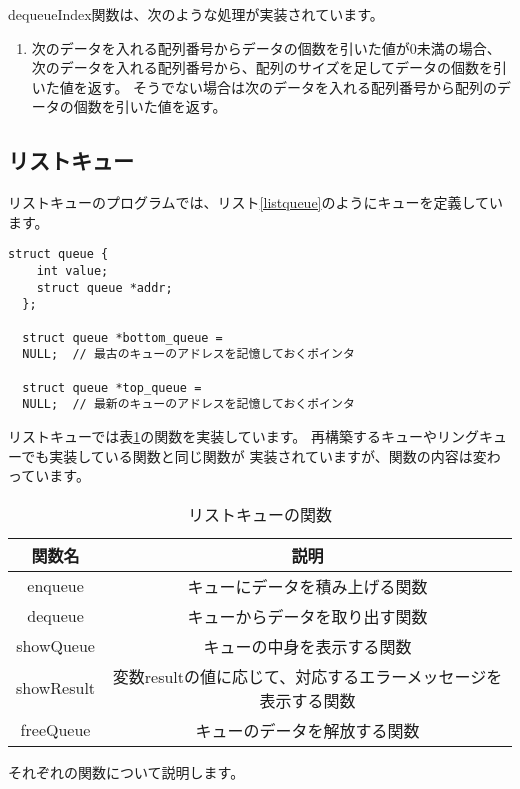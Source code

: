 \documentclass[a4j]{jarticle}
\begin{document}
dequeueIndex関数は、次のような処理が実装されています。
\begin{enumerate}
  \item 次のデータを入れる配列番号からデータの個数を引いた値が0未満の場合、
        次のデータを入れる配列番号から、配列のサイズを足してデータの個数を引いた値を返す。
        そうでない場合は次のデータを入れる配列番号から配列のデータの個数を引いた値を返す。
\end{enumerate}

\subsection{リストキュー}
リストキューのプログラムでは、リスト\ref{listqueue}のようにキューを定義しています。
\begin{lstlisting}[caption=リストキュープログラムのキューの定義,label=listqueue]
  struct queue {
    int value;
    struct queue *addr;
  };

  struct queue *bottom_queue =
  NULL;  // 最古のキューのアドレスを記憶しておくポインタ

  struct queue *top_queue =
  NULL;  // 最新のキューのアドレスを記憶しておくポインタ
\end{lstlisting}

リストキューでは表\ref{listqueuefunc}の関数を実装しています。
再構築するキューやリングキューでも実装している関数と同じ関数が
実装されていますが、関数の内容は変わっています。

\begin{table}[htbp]
  \centering
  \caption{リストキューの関数}
  \label{listqueuefunc}
  \begin{tabular}{|c|c|}
    \hline
    関数名        & 説明                                 \\
    \hline
    enqueue    & キューにデータを積み上げる関数                    \\
    \hline
    dequeue    & キューからデータを取り出す関数                    \\
    \hline
    showQueue  & キューの中身を表示する関数                      \\
    \hline
    showResult & 変数resultの値に応じて、対応するエラーメッセージを表示する関数 \\
    \hline
    freeQueue  & キューのデータを解放する関数                     \\
    \hline
  \end{tabular}
\end{table}
それぞれの関数について説明します。
\end{document}
